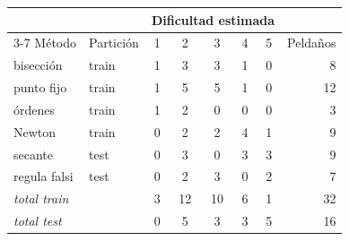 \begin{tabular}{@{}llcccccr@{}}
\toprule
 & & \multicolumn{5}{c}{Dificultad estimada} & \\
\cmidrule(lr){3-7}
Método & Partición & 1 & 2 & 3 & 4 & 5 & Peldaños\\
\midrule
bisección & train & 1 & 3 & 3 & 1 & 0 & 8\\
punto fijo & train & 1 & 5 & 5 & 1 & 0 & 12\\
órdenes & train & 1 & 2 & 0 & 0 & 0 & 3\\
Newton & train & 0 & 2 & 2 & 4 & 1 & 9\\
\midrule
secante & test & 0 & 3 & 0 & 3 & 3 & 9\\
regula falsi & test & 0 & 2 & 3 & 0 & 2 & 7\\
\midrule
\textit{total train} & & 3 & 12 & 10 & 6 & 1 & 32\\
\textit{total test} & & 0 & 5 & 3 & 3 & 5 & 16\\
\bottomrule
\end{tabular}
